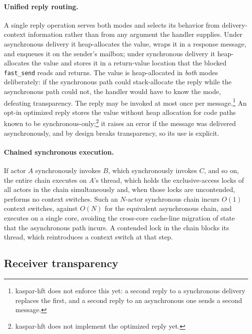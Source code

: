 \documentclass[11pt]{article}
\newcommand{\fs}{\texttt{fast\_send}}
\begin{document}
\paragraph{Unified reply routing.} A single reply operation serves both modes and
selects its behavior from delivery-context information rather than from any
argument the handler supplies. Under asynchronous delivery it heap-allocates the
value, wraps it in a response message, and enqueues it on the sender's mailbox;
under synchronous delivery it heap-allocates the value and stores it in a
return-value location that the blocked \fs{} reads and returns. The value is
heap-allocated in \emph{both} modes deliberately: if the synchronous path could
stack-allocate the reply while the asynchronous path could not, the handler would
have to know the mode, defeating transparency. The reply may be invoked at most
once per message.\footnote{kaspar-hft does not enforce this yet: a second reply
to a synchronous delivery replaces the first, and a second reply to an
asynchronous one sends a second message.} An opt-in optimized reply stores the
value without heap allocation for code paths known to be
synchronous-only;\footnote{kaspar-hft does not implement the optimized reply
yet.} it raises an error if the message was delivered asynchronously, and by
design breaks transparency, so its use is explicit.

\paragraph{Chained synchronous execution.} If actor $A$ synchronously invokes
$B$, which synchronously invokes $C$, and so on, the entire chain executes on
$A$'s thread, which holds the exclusive-access locks of all actors in the chain
simultaneously and, when those locks are uncontended, performs no context
switches. Such an $N$-actor synchronous chain incurs $O(1)$ context switches,
against $O(N)$ for the equivalent asynchronous chain, and executes on a single
core, avoiding the cross-core cache-line migration of state that the asynchronous
path incurs. A contended lock in the chain blocks its thread, which reintroduces
a context switch at that step.

\subsection{Receiver transparency}
\label{sec:transparency}
\end{document}
